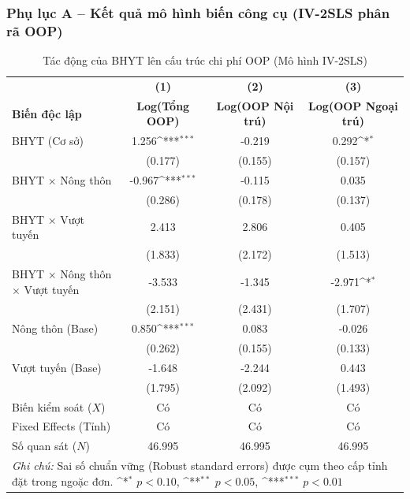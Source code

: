 \documentclass[12pt,a4paper]{article}
\begin{document}
\subsubsection{Phụ lục A – Kết quả mô hình biến công cụ (IV-2SLS phân rã OOP)}

\begin{table}[htbp]
	\centering
	\def\sym#1{\ifmmode^{#1}\else\(^{#1}\)\fi}
	\caption{Tác động của BHYT lên cấu trúc chi phí OOP (Mô hình IV-2SLS)}
	\label{tab:iv_appendix}
	\begin{tabular}{lccc}
		\toprule
		&\textbf{(1)}&\textbf{(2)}&\textbf{(3)}\\
		\textbf{Biến độc lập}&\textbf{Log(Tổng OOP)}&\textbf{Log(OOP Nội trú)}&\textbf{Log(OOP Ngoại trú)}\\
		\midrule
		BHYT (Cơ sở) & 1.256\sym{***} & -0.219 & 0.292\sym{*} \\
		& (0.177) & (0.155) & (0.157) \\
		\addlinespace
		BHYT $\times$ Nông thôn & -0.967\sym{***} & -0.115 & 0.035 \\
		& (0.286) & (0.178) & (0.137) \\
		\addlinespace
		BHYT $\times$ Vượt tuyến & 2.413 & 2.806 & 0.405 \\
		& (1.833) & (2.172) & (1.513) \\
		\addlinespace
		BHYT $\times$ Nông thôn $\times$ Vượt tuyến & -3.533 & -1.345 & -2.971\sym{*} \\
		& (2.151) & (2.431) & (1.707) \\
		\addlinespace
		Nông thôn (Base) & 0.850\sym{***} & 0.083 & -0.026 \\
		& (0.262) & (0.155) & (0.133) \\
		\addlinespace
		Vượt tuyến (Base) & -1.648 & -2.244 & 0.443 \\
		& (1.795) & (2.092) & (1.493) \\
		\midrule
		Biến kiểm soát ($X$) & Có & Có & Có \\
		Fixed Effects (Tỉnh) & Có & Có & Có \\
		\midrule
		Số quan sát ($N$) & 46.995 & 46.995 & 46.995 \\
		\bottomrule
		\multicolumn{4}{p{13cm}}{\footnotesize \textit{Ghi chú:} Sai số chuẩn vững (Robust standard errors) được cụm theo cấp tỉnh đặt trong ngoặc đơn. \newline \sym{*} \(p<0.10\), \sym{**} \(p<0.05\), \sym{***} \(p<0.01\)}
	\end{tabular}
\end{table}
\end{document}
